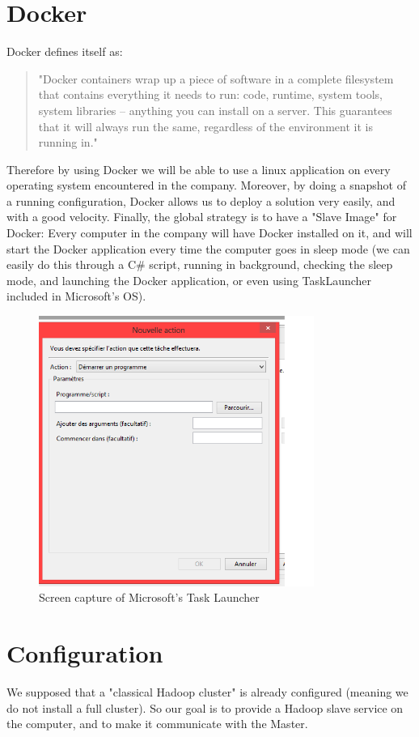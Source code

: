 \documentclass[11pt]{report} %
\begin{document}
\section{Docker}
Docker defines itself as: \begin{quote}"Docker containers wrap up a piece of software in a complete filesystem that contains everything it needs to run: code, runtime, system tools, system libraries – anything you can install on a server. This guarantees that it will always run the same, regardless of the environment it is running in."\end{quote}

Therefore by using Docker we will be able to use a linux application on every operating system encountered in the company.
Moreover, by doing a snapshot of a running configuration, Docker allows us to deploy a solution very easily, and with a good velocity.
Finally, the global strategy is to have a "Slave Image" for Docker:
Every computer in the company will have Docker installed on it, and will start the Docker application every time the computer goes in sleep mode (we can easily do this through a C\# script, running in background, checking the sleep mode, and launching the Docker application, or even using TaskLauncher included in Microsoft's OS).

\begin{figure}[ht!]
\centering
\includegraphics[width=90mm]{screen.png}
\caption{Screen capture of Microsoft's Task Launcher \label{overflow}}
\end{figure}

\section{Configuration}
We supposed that a "classical Hadoop cluster" is already configured (meaning we do not install a full cluster). So our goal is to provide a Hadoop slave service on the computer, and to make it communicate with the Master.
\end{document}
